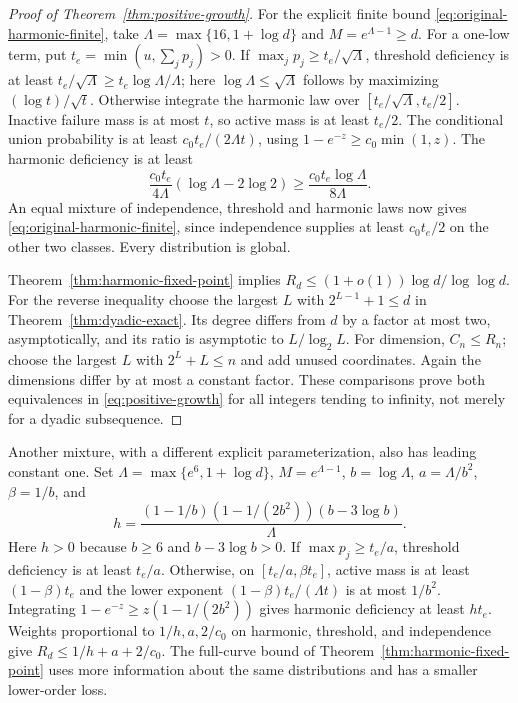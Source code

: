 \begin{proof}[Proof of Theorem~\ref{thm:positive-growth}]
For the explicit finite bound \eqref{eq:original-harmonic-finite}, take
$\Lambda=\max\{16,1+\log d\}$ and $M=e^{\Lambda-1}\ge d$.
For a one-low term, put $t_e=\min(u,\sum_jp_j)>0$.
If $\max_jp_j\ge t_e/\sqrt\Lambda$, threshold deficiency is at least
$t_e/\sqrt\Lambda\ge t_e\log\Lambda/\Lambda$; here
$\log\Lambda\le\sqrt\Lambda$ follows by maximizing
$(\log t)/\sqrt t$. Otherwise integrate the harmonic law over
$[t_e/\sqrt\Lambda,t_e/2]$. Inactive failure mass is at most $t$,
so active mass is at least $t_e/2$. The conditional union probability is
at least $c_0t_e/(2\Lambda t)$, using $1-e^{-z}\ge c_0\min(1,z)$.
The harmonic deficiency is at least
\[
 \frac{c_0t_e}{4\Lambda}(\log\Lambda-2\log2)
 \ge\frac{c_0t_e\log\Lambda}{8\Lambda}.
\]
An equal mixture of independence, threshold and harmonic laws now gives
\eqref{eq:original-harmonic-finite}, since independence supplies at least
$c_0t_e/2$ on the other two classes. Every distribution is global.

Theorem~\ref{thm:harmonic-fixed-point} implies
$R_d\le(1+o(1))\log d/\log\log d$.
For the reverse inequality choose the largest $L$ with
$2^{L-1}+1\le d$ in Theorem~\ref{thm:dyadic-exact}. Its degree differs
from $d$ by a factor at most two, asymptotically, and its ratio is
asymptotic to $L/\log_2 L$. For dimension, $C_n\le R_n$; choose the
largest $L$ with $2^L+L\le n$ and add unused coordinates. Again the
dimensions differ by at most a constant factor. These comparisons prove
both equivalences in \eqref{eq:positive-growth} for all integers tending
to infinity, not merely for a dyadic subsequence.
\end{proof}

Another mixture, with a different explicit parameterization, also has
leading constant one. Set $\Lambda=\max\{e^6,1+\log d\}$,
$M=e^{\Lambda-1}$, $b=\log\Lambda$, $a=\Lambda/b^2$, $\beta=1/b$, and
\begin{equation}\label{eq:older-leading-mixture}
 h=\frac{(1-1/b)(1-1/(2b^2))(b-3\log b)}{\Lambda}.
\end{equation}
Here $h>0$ because $b\ge6$ and $b-3\log b>0$.
If $\max p_j\ge t_e/a$, threshold deficiency is at least $t_e/a$.
Otherwise, on $[t_e/a,\beta t_e]$, active mass is at least
$(1-\beta)t_e$ and the lower exponent
$(1-\beta)t_e/(\Lambda t)$ is at most $1/b^2$.
Integrating $1-e^{-z}\ge z(1-1/(2b^2))$ gives harmonic deficiency
at least $ht_e$. Weights proportional to $1/h,a,2/c_0$ on harmonic,
threshold, and independence give $R_d\le1/h+a+2/c_0$. The full-curve
bound of Theorem~\ref{thm:harmonic-fixed-point} uses more information
about the same distributions and has a smaller lower-order loss.

